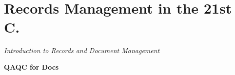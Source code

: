 \documentclass[12pt, letterpaper]{article}
\begin{document}
\section{Records Management in the 21st C.}
\large
\begin{flushleft}
\textit{Introduction to Records and Document Management}
\end{flushleft}
\normalsize

\begin{outline}[enumerate]
\1 \textbf{QAQC for Docs}

\end{outline}



\section{}
\large
\begin{flushleft}
\textit{}
\end{flushleft}
\normalsize

\begin{outline}[enumerate]
\1 \textbf{}

\end{outline}





\clearpage 
\renewcommand{\thepage}{}
\printbibliography
\end{document}
